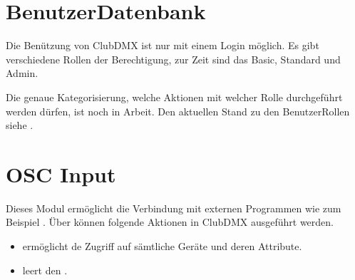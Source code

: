 \documentclass[letterpaper,10pt,ngerman]{sphinxmanual}
\begin{document}
\section{Benutzer\sphinxhyphen{}Datenbank}
\label{\detokenize{arbeiten:benutzer-datenbank}}
Die Benützung von ClubDMX ist nur mit einem Login möglich.
Es gibt verschiedene Rollen der Berechtigung, zur Zeit sind das
Basic, Standard und Admin.

Die genaue Kategorisierung, welche Aktionen mit welcher Rolle
durchgeführt werden dürfen, ist noch in Arbeit. Den aktuellen Stand zu den
Benutzer\sphinxhyphen{}Rollen siehe {\hyperref[\detokenize{benutzer:benutzer-label}]{}} .


\section{OSC Input}
\label{\detokenize{arbeiten:osc-input}}\label{\detokenize{arbeiten:osc-commands}}
Dieses Modul ermöglicht die Verbindung mit externen Programmen wie zum Beispiel
 . Über
 können
folgende Aktionen in ClubDMX ausgeführt werden.

\begin{itemize}
\item {} 
 ermöglicht de Zugriff auf sämtliche
Geräte und deren Attribute.


\item {} 
 leert den {\hyperref[\detokenize{grundlagen:topcuelabel}]{}} .

\end{itemize}
\end{document}
